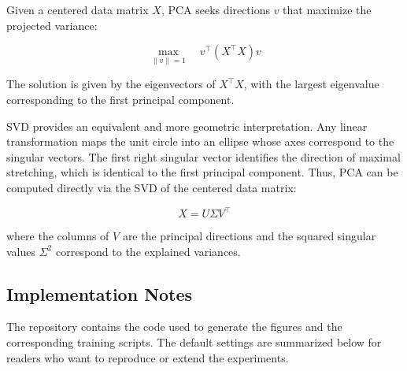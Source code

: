 \documentclass[11pt]{article}
\begin{document}
Given a centered data matrix $X$, PCA seeks directions $v$ that maximize the projected variance:

\[
\max_{\|v\|=1} \quad v^{\top} (X^{\top} X) v
\]

The solution is given by the eigenvectors of $X^{\top}X$, with the largest eigenvalue corresponding to the first principal component.

SVD provides an equivalent and more geometric interpretation. Any linear transformation maps the unit circle into an ellipse whose axes correspond to the singular vectors. The first right singular vector identifies the direction of maximal stretching, which is identical to the first principal component. Thus, PCA can be computed directly via the SVD of the centered data matrix:

\[
X = U \Sigma V^{\top}
\]

where the columns of $V$ are the principal directions and the squared singular values $\Sigma^{2}$ correspond to the explained variances.

\subsection{Implementation Notes}

The repository contains the code used to generate the figures and the corresponding training scripts. The default settings are summarized below for readers who want to reproduce or extend the experiments.
\end{document}
